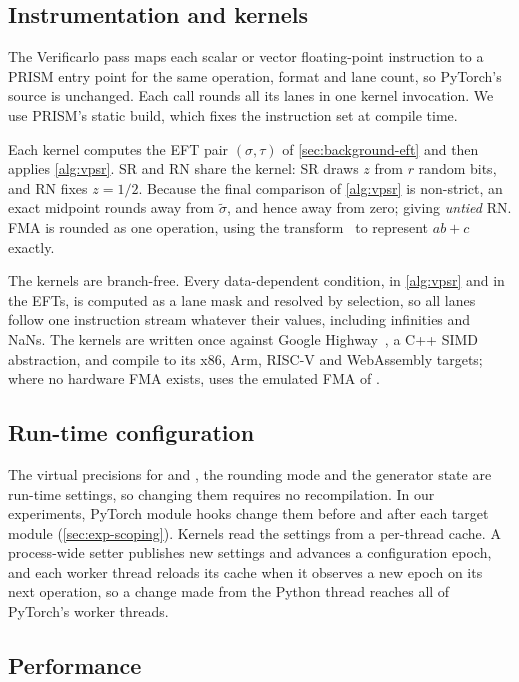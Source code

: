 \subsection{Instrumentation and kernels}
\label{sec:prism-kernels}

The Verificarlo pass maps each scalar or vector floating-point instruction to a
PRISM entry point for the same operation, format and lane count, so PyTorch's
source is unchanged. Each call rounds all its lanes in one kernel invocation.
We use PRISM's static build, which fixes the instruction set at compile time.

Each kernel computes the EFT pair $(\sigma,\tau)$ of \cref{sec:background-eft}
and then applies \cref{alg:vpsr}. SR and RN share the kernel: SR draws $z$ from
$r$ random bits, and RN fixes $z=1/2$. Because the final comparison of
\cref{alg:vpsr} is non-strict, an exact midpoint rounds away from
$\tilde\sigma$, and hence away from zero; giving \emph{untied} RN.
FMA is rounded as one operation, using the 
transform~\citep{boldo2011exact} to represent $ab+c$ exactly.

The kernels are branch-free. Every data-dependent condition, in
\cref{alg:vpsr} and in the EFTs, is computed as a lane mask and resolved by
selection, so all lanes follow one instruction stream whatever their values,
including infinities and NaNs. The kernels are written once against Google
Highway~\citep{highway}, a C++ SIMD abstraction, and compile to its x86, Arm,
RISC-V and WebAssembly targets; where no hardware FMA exists, 
uses the emulated FMA of \citet{graillat2023emulation}.

\subsection{Run-time configuration}
\label{sec:prism-config}

The virtual precisions for  and , the rounding
mode and the generator state are run-time settings, so changing them requires
no recompilation. In our experiments, PyTorch module hooks change them before
and after each target module (\cref{sec:exp-scoping}). Kernels read the
settings from a per-thread cache. A process-wide setter publishes new settings
and advances a configuration epoch, and each worker thread reloads its cache
when it observes a new epoch on its next operation, so a change made from the
Python thread reaches all of PyTorch's worker threads.

\subsection{Performance}
\label{sec:prism-bench}

